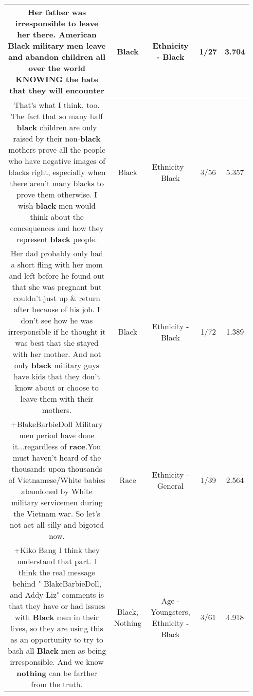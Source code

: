 \documentclass[11pt]{article}
\newlength\mylength
\begin{document}
\begin{center}
\begin{longtable}{|C{.65\mylength}|C{.30\mylength}|C{.12\mylength}|C{.12\mylength}|C{.12\mylength}|}
  \small Her father was irresponsible to leave her there.  American \textbf{Black} military men leave and abandon children all over the world KNOWING the hate that they will encounter\normalsize   & Black & Ethnicity - Black & 1/27 & 3.704 \\  \hline
  \small That's what I think, too. The fact that so many half \textbf{black} children are only raised by their non-\textbf{black} mothers prove all the people who have negative images of blacks right, especially when there aren't many blacks to prove them otherwise. I wish \textbf{black} men would think about the concequences and how they represent \textbf{black} people.\normalsize   & Black & Ethnicity - Black & 3/56 & 5.357 \\  \hline
  \small Her dad probably only had a short fling with her mom and left before he found out that she was pregnant but couldn't just up \& return after because of his job. I don't see how he was irresponsible if he thought it was best that she stayed with her mother. And not only \textbf{black} military guys have kids that they don't know about or choose to leave them with their mothers.\normalsize   & Black & Ethnicity - Black & 1/72 & 1.389 \\  \hline
  \small +BlakeBarbieDoll  Military men period have done it...regardless of \textbf{race}.You must haven't heard of the thousands upon  thousands of  Vietnamese/White  babies abandoned by  White military servicemen during  the Vietnam  war.  So let's not act all silly and bigoted now.\normalsize   & Race & Ethnicity - General & 1/39 & 2.564 \\  \hline
  \small +Kiko Bang  I think they understand that part.  I think the  real message behind  " BlakeBarbieDoll, and Addy Liz"    comments is that they  have or had issues with \textbf{Black} men in their lives, so they are  using this as an opportunity to try to bash all \textbf{Black} men as being irresponsible.   And we know \textbf{nothing} can be farther from the truth.\normalsize   & Black, Nothing & Age - Youngsters, Ethnicity - Black & 3/61 & 4.918 \\  \hline

\end{longtable}
\end{center}
\end{document}
